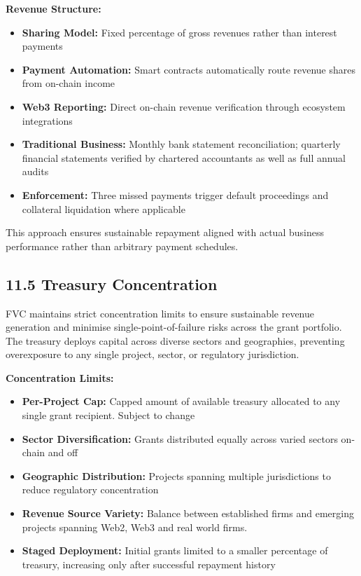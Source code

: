 \documentclass[
  paper=a4,
  ,captions=tableheading
]{scrartcl}
\providecommand{\tightlist}{%
  \setlength{\itemsep}{0pt}\setlength{\parskip}{0pt}}
\begin{document}
\textbf{Revenue Structure:}

\begin{itemize}
\tightlist
\item
  \textbf{Sharing Model:} Fixed percentage of gross revenues rather than
  interest payments
\item
  \textbf{Payment Automation:} Smart contracts automatically route
  revenue shares from on-chain income
\item
  \textbf{Web3 Reporting:} Direct on-chain revenue verification through
  ecosystem integrations
\item
  \textbf{Traditional Business:} Monthly bank statement reconciliation;
  quarterly financial statements verified by chartered accountants as
  well as full annual audits
\item
  \textbf{Enforcement:} Three missed payments trigger default
  proceedings and collateral liquidation where applicable
\end{itemize}

This approach ensures sustainable repayment aligned with actual business
performance rather than arbitrary payment schedules.

\subsection{11.5 Treasury Concentration}\label{treasury-concentration}

FVC maintains strict concentration limits to ensure sustainable revenue
generation and minimise single-point-of-failure risks across the grant
portfolio. The treasury deploys capital across diverse sectors and
geographies, preventing overexposure to any single project, sector, or
regulatory jurisdiction.

\textbf{Concentration Limits:}

\begin{itemize}
\tightlist
\item
  \textbf{Per-Project Cap:} Capped amount of available treasury allocated
  to any single grant recipient. Subject to change
\item
  \textbf{Sector Diversification:} Grants distributed equally across
  varied sectors on-chain and off
\item
\textbf{Geographic Distribution:} Projects spanning multiple
jurisdictions to reduce regulatory concentration
\item
  \textbf{Revenue Source Variety:} Balance between established firms
  and emerging projects spanning Web2, Web3 and real world firms.
\item
  \textbf{Staged Deployment:} Initial grants limited to a smaller
  percentage of treasury, increasing only after successful repayment
  history
\end{itemize}
\end{document}
